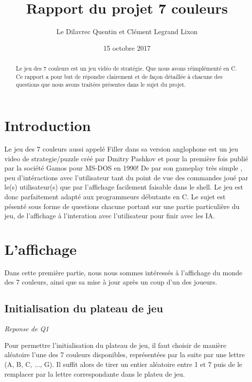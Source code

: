 \documentclass[a4paper,11pt]{article}
\begin{document}
\title{Rapport du projet 7 couleurs}

\author{Le Dilavrec Quentin et Clément Legrand Lixon}

\date{15 octobre 2017}

\maketitle

\begin{abstract}
Le jeu des 7 couleurs est un jeu vidéo de stratégie.
Que nous avons réimplémenté en C. Ce rapport a pour but de répondre 
clairement et de façon détaillée à chacune des questions  que nous avons
traitées présentes dans le sujet du projet.
\end{abstract}


\section{Introduction}
Le jeu des 7 couleurs aussi appelé Filler dans sa version anglophone est 
un jeu video de strategie/puzzle créé par Dmitry Pashkov et pour la première 
fois publié par la société Gamos pour MS-DOS en 1990! De par son gameplay 
très simple , peu d'intéractions avec l'utilisateur tant du point de vue des commandes 
joué par le(s) utilisateur(s) que par l'affichage facilement faisable dans le shell. 
Le jeu est donc parfaitement adapté aux programmeurs débutants en C. Le sujet est 
pésenté sous forme de questions chacune portant sur une partie particulière du jeu, 
de l'affichage à l'interation avec l'utilisateur pour finir avec les IA.


\section{L'affichage}

Dans cette première partie, nous nous sommes intéressés à l'affichage
du monde des 7 couleurs, ainsi que sa mise à jour après un coup d'un des
joueurs.

\subsection{Initialisation du plateau de jeu}
\emph{Reponse de Q1}

Pour permettre l'initialisation du plateau de jeu, il faut choisir de manière aléatoire l'une des 7 couleurs disponibles, représentées par la suite par une lettre (A, B, C, ..., G). Il suffit alors de tirer un entier aléatoire entre 1 et 7 puis de le remplacer par la lettre correspondante dans le plateu de jeu. 
\end{document}
